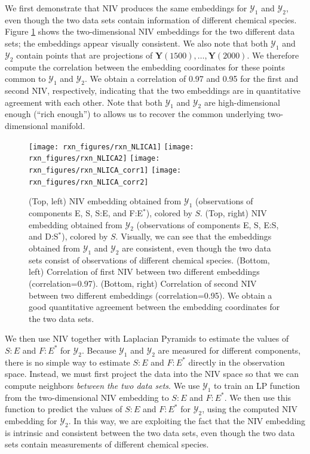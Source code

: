 \documentclass[aip,jcp,preprint]{revtex4-1}
\begin{document}
We first demonstrate that NIV produces the same embeddings for $\mathcal{Y}_1$ and $\mathcal{Y}_2$, even though the two data sets contain information of different chemical species.
%
Figure \ref{fig:rxn_embedding} shows the two-dimensional NIV embeddings for the two different data sets; the embeddings appear visually consistent.
%
We also note that both $\mathcal{Y}_1$ and $\mathcal{Y}_2$ contain points that are projections of $\mathbf{Y}(1500), \dots, \mathbf{Y}(2000)$.
%
We therefore compute the correlation between the embedding coordinates for these points common to $\mathcal{Y}_1$ and $\mathcal{Y}_2$.
%
We obtain a correlation of 0.97 and 0.95 for the first and second NIV, respectively, indicating that the two embeddings are in quantitative
agreement with each other.
%
Note that both $\mathcal{Y}_1$ and $\mathcal{Y}_2$ are high-dimensional enough (``rich enough'') to allows us to recover
the common underlying two-dimensional manifold.
%
\begin{figure}[ht]
    \texttt{[image: rxn\_figures/rxn\_NLICA1]}
    \texttt{[image: rxn\_figures/rxn\_NLICA2]}
    \texttt{[image: rxn\_figures/rxn\_NLICA\_corr1]}
    \texttt{[image: rxn\_figures/rxn\_NLICA\_corr2]}
    \caption{(Top, left) NIV embedding obtained from $\mathcal{Y}_1$ (observations of components E, S, S:E, and F:E$^{*}$), colored by $S$. (Top, right) NIV embedding obtained from $\mathcal{Y}_2$ (observations of components E, S, E:S, and D:S$^{*}$), colored by $S$. Visually, we can see that the embeddings obtained from $\mathcal{Y}_1$ and $\mathcal{Y}_2$ are consistent, even though the two data sets consist of observations of different chemical species. (Bottom, left) Correlation of first NIV between two different embeddings (correlation=0.97). (Bottom, right)  Correlation of second NIV between two different embeddings (correlation=0.95). We obtain a good quantitative agreement between the embedding coordinates for the two data sets.}
    \label{fig:rxn_embedding}
\end{figure}

We then use NIV together with Laplacian Pyramids to estimate the values of $S:E$ and $F:E^{*}$ for $\mathcal{Y}_2$.
%
Because $\mathcal{Y}_1$ and $\mathcal{Y}_2$ are measured for different components, there is no simple way to estimate $S:E$ and $F:E^{*}$ directly in the observation space.
%
Instead, we must first project the data into the NIV space so that we can compute neighbors {\em between the two data sets}.
%
We use $\mathcal{Y}_1$ to train an LP function from the two-dimensional NIV embedding to $S:E$ and $F:E^{*}$.
%
We then use this function to predict the values  of $S:E$ and $F:E^{*}$ for $\mathcal{Y}_2$, using the computed NIV embedding for $\mathcal{Y}_2$.
%
In this way, we are exploiting the fact that the NIV embedding is intrinsic and consistent between the two data sets, even though the two data sets contain measurements of different chemical species.
\end{document}

